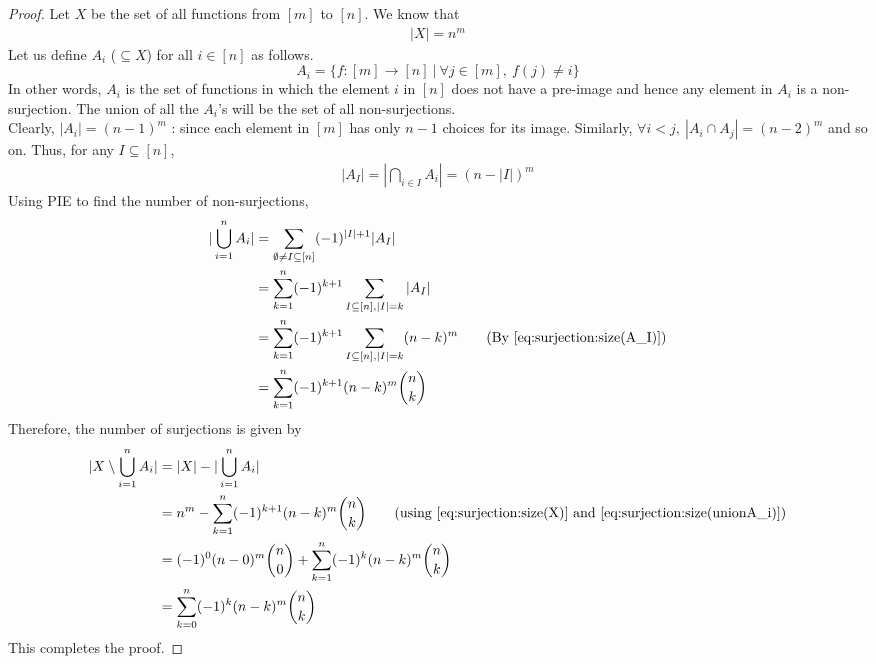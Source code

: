 \begin{proof}
Let $X$ be the set of all functions from $[m]$ to $[n]$. We know that
\begin{align}
    |X| = n^m \label{eq:surjection:size(X)}
\end{align}
Let us define $A_i$ ($\subseteq X$) for all $i\in[n]$ as follows.
$$A_i = \{f : [m] \rightarrow [n] ~|~ \forall j \in [m],~ f(j) \neq i\} $$
In other words, $A_i$ is the set of functions in which the element $i$ in $[n]$  does not have a pre-image and hence any element in $A_i$ is a non-surjection. The union of all the $A_i$'s will be the set of all non-surjections.\\
Clearly, $|A_i| = (n-1)^m$ : since each element in $[m]$ has only $n-1$ choices for its image. Similarly, $\forall i < j, ~|A_i\cap A_j| = (n-2)^m$ and so on. Thus, for any $I \subseteq [n]$,
\begin{align}
|A_I| = |\bigcap_{i \in I} A_i| = (n-|I|)^m \label{eq:surjection:size(A_I)}
\end{align}
Using PIE to find the number of non-surjections, 
\begin{align}
|\bigcup_{i=1}^{n} A_i| &= \sum_{\emptyset \neq I \subseteq [n]} (-1)^{|I| +1} |A_I|\nonumber\\
&= \sum_{k=1}^{n} (-1)^{k+1} \sum_{I \subseteq [n], |I| = k} |A_I|\nonumber\\
&= \sum_{k=1}^{n} (-1)^{k+1} \sum_{I \subseteq [n], |I| = k} (n-k)^m \nonumber\tag{By \ref{eq:surjection:size(A_I)}}\\
&= \sum_{k=1}^{n} (-1)^{k+1} (n-k)^m {n \choose k} \label{eq:surjection:size(unionA_i)}
\end{align}
Therefore, the number of surjections is given by
\begin{align*}
|X \setminus \bigcup_{i=1}^{n} A_i| &= |X| - |\bigcup_{i=1}^{n} A_i|\\
&= n^m - \sum_{k=1}^{n} (-1)^{k+1} (n-k)^m {n \choose k} \tag{using \ref{eq:surjection:size(X)} and \ref{eq:surjection:size(unionA_i)}}\\
&= (-1)^0 (n-0)^m {n \choose 0}+ \sum_{k=1}^{n} (-1)^{k} (n-k)^m {n \choose k}\\
&= \sum_{k=0}^{n} (-1)^{k} (n-k)^m {n \choose k}
\end{align*}
This completes the proof.
\end{proof}
\noindent\\

